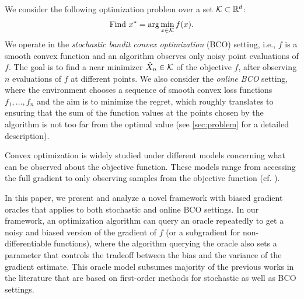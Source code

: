 We consider the following optimization problem over a set $\mathcal{K} \subset \mathbb{R}^d$:
\begin{align}
\mbox{Find } x^* = \arg\min_{x \in \mathcal{K}} f(x). \label{eq:pb}
\end{align}
We operate in the \textit{stochastic bandit convex optimization} (BCO) setting, i.e., $f$ is a smooth convex function and an algorithm observes only noisy point evaluations of $f$. The goal is to find a near minimizer $\hat X_n \in \mathcal{K}$ of the objective $f$, after observing $n$ evaluations of $f$ at different points.
We also consider the \textit{online BCO} setting, where the environment chooses a sequence of smooth convex loss functions $f_1,\dots,f_n$ and the aim is to minimize the regret, which roughly translates to ensuring
 that the sum of the function values at the points chosen by the algorithm is not too far from the optimal value 
 (see \cref{sec:problem} for a detailed description).

Convex optimization is widely studied under different models concerning what can be observed about the objective function. 
These models range from accessing the full gradient to only observing samples from the objective function (cf. \citealp{nesterov2004introductory,DeGliNe14,HaLe14:SOC,PoTsy90,flaxman2005online,AbHaRa08,AgDeXi10,Ne11:TR,AgFoHsuKaRa13:SIAM,katkul,kushcla,spall1992multivariate,spall1997one,Dip03:AoS,bhatnagar-book,duchi2015optimal}). 

In this paper, 
we present and analyze a novel framework with biased gradient oracles that applies to both stochastic and online BCO settings. 
In our framework, an optimization algorithm can query an oracle repeatedly to get a noisy and biased version of the gradient of $f$ (or a subgradient for non-differentiable functions), where the algorithm querying the oracle also sets a parameter that controls the tradeoff between the bias and the variance of the gradient estimate.
This oracle model subsumes majority of the previous works in the literature that are based on first-order methods for stochastic as well as BCO settings.


